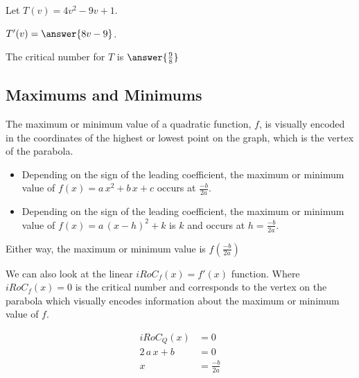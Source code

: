 \documentclass{ximera}
\begin{document}
\begin{question}  


Let $T(v) = 4 v^2 - 9 v + 1$.

$T'(v) = \answer{8v-9}$.

The critical number for $T$ is $\answer{\frac{9}{8}}$

\end{question}


























\subsection*{Maximums and Minimums}




The maximum or minimum value of a quadratic function, $f$, is visually encoded in the coordinates of the highest or lowest point on the graph, which is the vertex of the parabola.


\begin{itemize}
     \item Depending on the sign of the leading coefficient, the maximum or minimum value of $f(x) = a \, x^2 + b \, x + c$ occurs at $\frac{-b}{2a}$. 


     \item Depending on the sign of the leading coefficient, the maximum or minimum value of $f(x) = a \, (x - h)^2 + k$ is $k$ and occurs at $h = \frac{-b}{2a}$. 
\end{itemize}

Either way, the maximum or minimum value is $f\left( \frac{-b}{2a} \right)$




We can also look at the linear $iRoC_f(x) = f'(x)$ function.  Where $iRoC_f(x) = 0$ is the critical number and corresponds to the vertex on the parabola which visually encodes information about the maximum or minimum value of $f$.





\begin{align*}
iRoC_Q(x)       &= 0  \\
2 \, a \, x + b  & = 0  \\
x     &=  \frac{-b}{2a}
\end{align*}
\end{document}
